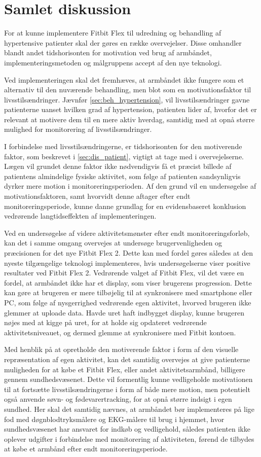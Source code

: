 \section{Samlet diskussion}

For at kunne implementere Fitbit Flex til udredning og behandling af hypertensive patienter skal der gøres en række overvejelser. Disse omhandler blandt andet tidshorisonten for motivation ved brug af armbåndet, implementeringsmetoden og målgruppens accept af den nye teknologi. 

Ved implementeringen skal det fremhæves, at armbåndet ikke fungere som et alternativ til den nuværende behandling, men blot som en motivationsfaktor til livsstilsændringer. Jævnfør \autoref{sec:beh_hypertension}, vil livsstilsændringer gavne patienterne uanset hvilken grad af hypertension, patienten lider af, hvorfor det er relevant at motivere dem til en mere aktiv hverdag, samtidig med at opnå større mulighed for monitorering af livsstilsændringer.

I forbindelse med livsstilsændringerne, er tidshorisonten for den motiverende faktor, som beskrevet i \autoref{sec:dis_patient}, vigtigt at tage med i overvejelserne. Lægen vil grundet denne faktor ikke nødvendigvis få et præcist billede af patientens almindelige fysiske aktivitet, som følge af patienten sandsynligvis dyrker mere motion i monitoreringsperioden. Af den grund vil en undersøgelse af motivationsfaktoren, samt hvorvidt denne aftager efter endt monitoreringsperiode, kunne danne grundlag for en evidensbaseret konklusion vedrørende langtidseffekten af implementeringen.

Ved en undersøgelse af videre aktivitetsmønster efter endt monitoreringsforløb, kan det i samme omgang overvejes at undersøge brugervenligheden og præcisionen for det nye Fitbit Flex 2. Dette kan med fordel gøres således at den nyeste tilgængelige teknologi implementeres, hvis undersøgelserne viser positive resultater ved Fitbit Flex 2. Vedrørende valget af Fitbit Flex, vil det være en fordel, at armbåndet ikke har et display, som viser brugerens progression. Dette kan gøre at brugeren er mere tilbøjelig til at synkronisere med smartphone eller PC, som følge af nysgerrighed vedrørende egen aktivitet, hvorved brugeren ikke glemmer at uploade data. Havde uret haft indbygget display, kunne brugeren nøjes med at kigge på uret, for at holde sig opdateret vedrørende aktivitetsniveauet, og dermed glemme at synkronisere med Fitbit kontoen.

Med henblik på at opretholde den motiverende faktor i form af den visuelle repræsentation af egen aktivitet, kan det samtidig overvejes at give patienterne muligheden for at købe et Fitbit Flex, eller andet aktivitetsarmbånd, billigere gennem sundhedsvæsenet. Dette vil formentlig kunne vedligeholde motivationen til at fortsætte livsstilsændringerne i form af både mere motion, men potentielt også anvende søvn- og fødevarertracking, for at opnå større indsigt i egen sundhed. Her skal det samtidig nævnes, at armbåndet bør implementeres på lige fod med døgnblodtryksmålere og EKG-målere til brug i hjemmet, hvor sundhedsvæsenet har ansvaret for indkøb og vedligehold, således patienten ikke oplever udgifter i forbindelse med monitorering af aktiviteten, førend de tilbydes at købe et armbånd efter endt monitoreringsperiode.